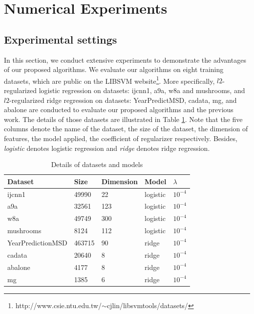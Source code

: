 \documentclass[conference]{IEEEtran}
\begin{document}
 
 \section{Numerical Experiments}
 \label{numexperiments}
 \subsection{Experimental settings}
 In this section, we conduct extensive experiments to demonstrate the advantages of our proposed algorithms. We evaluate our algorithms on eight training datasets, which are public on the LIBSVM website\footnote{http://www.csie.ntu.edu.tw/$\sim$cjlin/libsvmtools/datasets/}. More specifically,  $l2$-regularized logistic regression on datasets: ijcnn1, a9a, w8a and mushrooms, and $l2$-regularized ridge regression on datasets: YearPredictMSD, cadata, mg, and abalone  are conducted to evaluate our proposed algorithms and the previous work.  The details of those datasets are illustrated in Table \ref{data_information}. Note that the five columns denote the name of the dataset, the size of the dataset, the dimension of features, the model applied, the coefficient of regularizer respectively. Besides, \emph{logistic} denotes logistic regression and \emph{ridge} denotes ridge regression. 
 
 
 \begin{table}
\centering
\caption{Details of datasets and models}
\label{data_information}
\begin{tabular}{|l|l|l|l|l|}
\hline
Dataset           & Size & Dimension & Model & $\lambda$ \\ \hline
ijcnn1            &  49990 &  22 &   logistic    &  $10^{-4}$         \\
a9a               &   32561&123   &     logistic  &      $10^{-4}$     \\ 
w8a               &  49749 & 300   &  logistic &  $10^{-4}$     \\ 
mushrooms   &   8124     &112    & logistic   &  $10^{-4}$     \\ 
YearPredictionMSD & 463715  &  90 &    ridge  &      $10^{-4}$     \\
cadata              & 20640  &8   &     ridge  &    $10^{-4}$       \\ 
abalone          & 4177  & 8 &   ridge&   $10^{-4}$       \\ 
mg             &1385 &6 & ridge&  $10^{-4}$     \\ \hline
\end{tabular}
\end{table}
 
\end{document}

